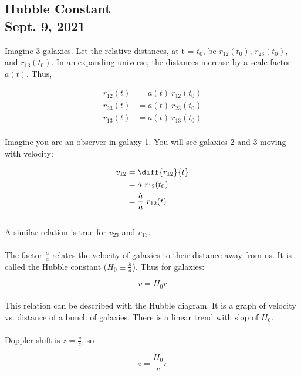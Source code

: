 \documentclass[]{article}
\begin{document}
\subsection{Hubble Constant\\ {\large \normalfont Sept. 9, 2021}}
\bigbreak

Imagine 3 galaxies. Let the relative distances, at  t = $t_0$, be $r_{12}(t_0)$, $r_{23}(t_0)$, and $r_{13}(t_0)$. In an expanding universe, the distances increase by a scale factor $a(t)$. Thus,

\begin{align*}
	r_{12}(t) &= a(t)~r_{12}(t_0)\\
	r_{23}(t) &= a(t)~r_{23}(t_0)\\
	r_{13}(t) &= a(t)~r_{13}(t_0)
\end{align*}\\

Imagine you are an observer in galaxy 1. You will see galaxies 2 and 3 moving with velocity:

\begin{align*}
	v_{12} &= \diff{r_{12}}{t} \\
	&= \dot{a}~r_{12}(t_0)\\
	&= \frac{\dot{a}}{a}~r_{12}(t)
\end{align*}\\

A similar relation is true for $v_{23}$ and $v_{13}$.\\\\

The factor $\frac{\dot{a}}{a}$ relates the velocity of galaxies to their distance away from us. It is called the Hubble constant ($H_0 \equiv \frac{\dot{a}}{a}$). Thus for galaxies:

\begin{equation}
	v = H_0 r
\end{equation}\\

This relation can be described with the Hubble diagram. It is a graph of velocity vs. distance of a bunch of galaxies. There is a linear trend with slop of $H_0$.\\\\

Doppler shift is $z = \frac{v}{c}$, so

\begin{equation}
	z = \frac{H_0}{c}r
\end{equation}\\
\end{document}
